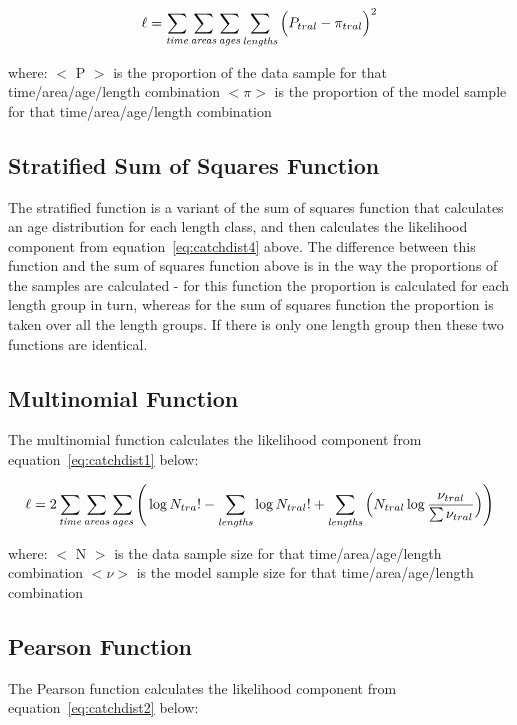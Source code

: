 \documentclass[10pt,twoside]{book}
\begin{document}
\begin{equation}\label{eq:catchdist4}
\ell = \sum_{\it time}\sum_{\it areas}\sum_{\it ages}\sum_{\it lengths} \Big( P_{tral} - \pi_{tral} \Big) ^2
\end{equation}

where:\newline
$<$ P $>$ is the proportion of the data sample for that time/area/age/length combination\newline
$<\pi>$ is the proportion of the model sample for that time/area/age/length combination

\subsection{Stratified Sum of Squares Function}
The stratified function is a variant of the sum of squares function that calculates an age distribution for each length class, and then calculates the likelihood component from equation~\ref{eq:catchdist4} above.  The difference between this function and the sum of squares function above is in the way the proportions of the samples are calculated - for this function the proportion is calculated for each length group in turn, whereas for the sum of squares function the proportion is taken over all the length groups.  If there is only one length group then these two functions are identical.

\subsection{Multinomial Function}
The multinomial function calculates the likelihood component from equation~\ref{eq:catchdist1} below:

\begin{equation}\label{eq:catchdist1}
\ell = 2 \sum_{\it time}\sum_{\it areas}\sum_{\it ages} \Bigg( \log N_{tra}! - \sum_{\it lengths} \log N_{tral}! + \sum_{\it lengths} \Big( N_{tral} \log {\frac{\nu_{tral}}{\sum \nu_{tral}}} \Big) \Bigg)
\end{equation}

where:\newline
$<$ N $>$ is the data sample size for that time/area/age/length combination\newline
$<\nu>$ is the model sample size for that time/area/age/length combination

\subsection{Pearson Function}
The Pearson function calculates the likelihood component from equation~\ref{eq:catchdist2} below:
\end{document}
